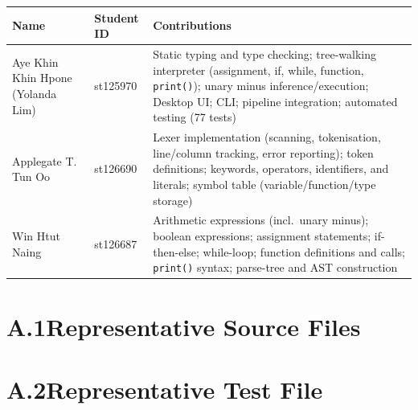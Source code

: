\begin{table}[H]
\centering
\renewcommand{\arraystretch}{1.4}
\small
\begin{tabular}{@{} p{3.8cm} p{1.8cm} p{8.0cm} @{}}
\toprule
\textbf{Name} & \textbf{Student ID} & \textbf{Contributions} \\
\midrule
Aye Khin Khin Hpone (Yolanda Lim) & st125970 & Static typing and type checking; tree-walking interpreter (assignment, if, while, function, \texttt{print()}); unary minus inference/execution; Desktop UI; CLI; pipeline integration; automated testing (77 tests) \\
Applegate T. Tun Oo & st126690 & Lexer implementation (scanning, tokenisation, line/column tracking, error reporting); token definitions; keywords, operators, identifiers, and literals; symbol table (variable/function/type storage) \\
Win Htut Naing & st126687 & Arithmetic expressions (incl.\ unary minus); boolean expressions; assignment statements; if-then-else; while-loop; function definitions and calls; \texttt{print()} syntax; parse-tree and AST construction \\
\bottomrule
\end{tabular}
\end{table}

\clearpage
\section*{A.1\quad Representative Source Files}













\section*{A.2\quad Representative Test File}


